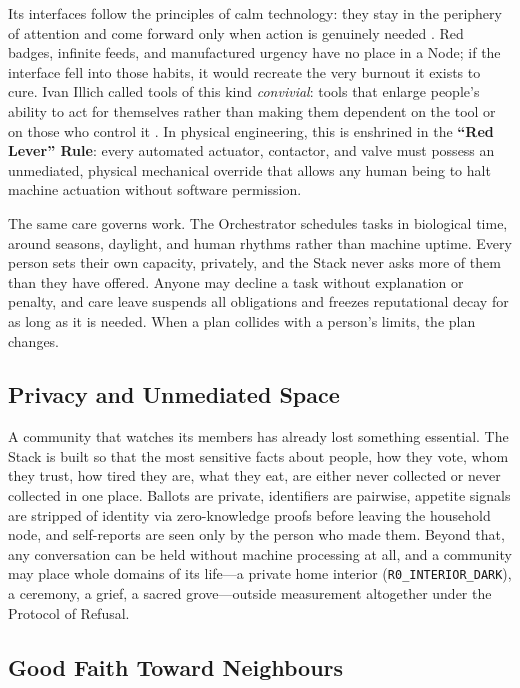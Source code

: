 Its interfaces follow the principles of calm technology: they stay in the periphery of attention and come forward only when action is genuinely needed \parencite{weiser1996calm}. Red badges, infinite feeds, and manufactured urgency have no place in a Node; if the interface fell into those habits, it would recreate the very burnout it exists to cure. Ivan Illich called tools of this kind \textit{convivial}: tools that enlarge people's ability to act for themselves rather than making them dependent on the tool or on those who control it \parencite{illich1973}. In physical engineering, this is enshrined in the \textbf{``Red Lever'' Rule}: every automated actuator, contactor, and valve must possess an unmediated, physical mechanical override that allows any human being to halt machine actuation without software permission.

The same care governs work. The Orchestrator schedules tasks in biological time, around seasons, daylight, and human rhythms rather than machine uptime. Every person sets their own capacity, privately, and the Stack never asks more of them than they have offered. Anyone may decline a task without explanation or penalty, and care leave suspends all obligations and freezes reputational decay for as long as it is needed. When a plan collides with a person's limits, the plan changes.

\subsection{Privacy and Unmediated Space}

A community that watches its members has already lost something essential. The Stack is built so that the most sensitive facts about people, how they vote, whom they trust, how tired they are, what they eat, are either never collected or never collected in one place. Ballots are private, identifiers are pairwise, appetite signals are stripped of identity via zero-knowledge proofs before leaving the household node, and self-reports are seen only by the person who made them. Beyond that, any conversation can be held without machine processing at all, and a community may place whole domains of its life---a private home interior (\texttt{R0\_INTERIOR\_DARK}), a ceremony, a grief, a sacred grove---outside measurement altogether under the Protocol of Refusal.

\subsection{Good Faith Toward Neighbours}

